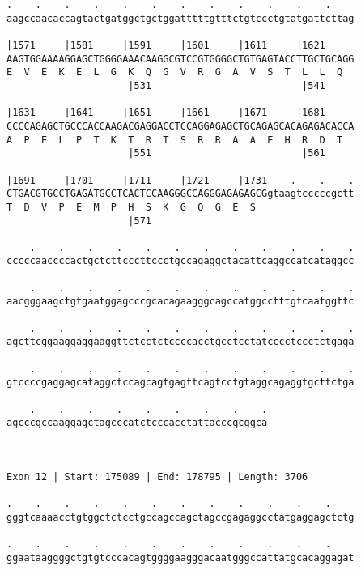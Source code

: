 \documentclass{article}
\begin{document}
\begin{Verbatim}
.    .    .    .    .    .    .    .    .    .    .    .    
aagccaacaccagtactgatggctgctggatttttgtttctgtccctgtatgattcttag
                                                            
|1571     |1581     |1591     |1601     |1611     |1621     
AAGTGGAAAAGGAGCTGGGGAAACAAGGCGTCCGTGGGGCTGTGAGTACCTTGCTGCAGG
E  V  E  K  E  L  G  K  Q  G  V  R  G  A  V  S  T  L  L  Q  
                     |531                          |541     
  
|1631     |1641     |1651     |1661     |1671     |1681     
CCCCAGAGCTGCCCACCAAGACGAGGACCTCCAGGAGAGCTGCAGAGCACAGAGACACCA
A  P  E  L  P  T  K  T  R  T  S  R  R  A  A  E  H  R  D  T  
                     |551                          |561     
  
|1691     |1701     |1711     |1721     |1731    .    .    .
CTGACGTGCCTGAGATGCCTCACTCCAAGGGCCAGGGAGAGAGCGgtaagtcccccgctt
T  D  V  P  E  M  P  H  S  K  G  Q  G  E  S                 
                     |571                                   
  
    .    .    .    .    .    .    .    .    .    .    .    .
cccccaaccccactgctcttcccttccctgccagaggctacattcaggccatcataggcc
                                                            
    .    .    .    .    .    .    .    .    .    .    .    .
aacgggaagctgtgaatggagcccgcacagaagggcagccatggcctttgtcaatggttc
                                                            
    .    .    .    .    .    .    .    .    .    .    .    .
agcttcggaaggaggaaggttctcctctccccacctgcctcctatcccctccctctgaga
                                                            
    .    .    .    .    .    .    .    .    .    .    .    .
gtccccgaggagcataggctccagcagtgagttcagtcctgtaggcagaggtgcttctga
                                                            
    .    .    .    .    .    .    .    .    .
agcccgccaaggagctagcccatctcccacctattacccgcggca
                                             
                                             
 
Exon 12 | Start: 175089 | End: 178795 | Length: 3706
 
.    .    .    .    .    .    .    .    .    .    .    .    
gggtcaaaacctgtggctctcctgccagccagctagccgagaggcctatgaggagctctg
                                                            
.    .    .    .    .    .    .    .    .    .    .    .    
ggaataaggggctgtgtcccacagtggggaagggacaatgggccattatgcacaggagat
                                                            

\end{Verbatim}
\end{document}

